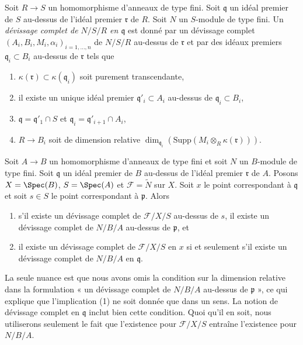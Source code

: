 \begin{definition}
\label{definition-complete-devissage-at-x-algebra}
Soit $R \to S$ un homomorphisme d'anneaux de type fini.
Soit $\mathfrak q$ un idéal premier de $S$ au-dessus de l'idéal premier $\mathfrak r$ de $R$.
Soit $N$ un $S$-module de type fini.
Un {\it d\'evissage complet de $N/S/R$ en $\mathfrak q$} est donné par un
d\'evissage complet $(A_i, B_i, M_i, \alpha_i)_{i = 1, \ldots, n}$
de $N/S/R$ au-dessus de $\mathfrak r$ et par des idéaux premiers $\mathfrak q_i \subset B_i$
au-dessus de $\mathfrak r$ tels que
\begin{enumerate}
\item $\kappa(\mathfrak r) \subset \kappa(\mathfrak q_i)$ soit purement
transcendante,
\item il existe un unique idéal premier $\mathfrak q'_i \subset A_i$
au-dessus de $\mathfrak q_i \subset B_i$,
\item $\mathfrak q = \mathfrak q'_1 \cap S$ et
$\mathfrak q_i = \mathfrak q'_{i + 1} \cap A_i$,
\item $R \to B_i$ soit de dimension relative
$\dim_{\mathfrak q_i}(\text{Supp}(M_i \otimes_R \kappa(\mathfrak r)))$.
\end{enumerate}
\end{definition}

\begin{remark}
\label{remark-same-notion}
Soit $A \to B$ un homomorphisme d'anneaux de type fini et soit $N$ un
$B$-module de type fini. Soit $\mathfrak q$ un idéal premier de $B$ au-dessus de l'idéal premier
$\mathfrak r$ de $A$. Posons $X = \Spec(B)$, $S = \Spec(A)$ et
$\mathcal{F} = \widetilde{N}$ sur $X$. Soit $x$ le point correspondant
à $\mathfrak q$ et soit $s \in S$ le point correspondant à
$\mathfrak p$. Alors
\begin{enumerate}
\item s'il existe un d\'evissage complet de $\mathcal{F}/X/S$
au-dessus de $s$, il existe un d\'evissage complet de
$N/B/A$ au-dessus de $\mathfrak p$, et
\item il existe un d\'evissage complet de $\mathcal{F}/X/S$
en $x$ si et seulement s'il existe un d\'evissage complet de
$N/B/A$ en $\mathfrak q$.
\end{enumerate}
La seule nuance est que nous avons omis la condition sur
la dimension relative dans la formulation « un d\'evissage complet de
$N/B/A$ au-dessus de $\mathfrak p$ », ce qui explique que l'implication (1)
ne soit donnée que dans un sens.
La notion de d\'evissage complet en
$\mathfrak q$ inclut bien cette condition. Quoi qu'il en soit, nous utiliserons
seulement le fait que l'existence pour $\mathcal{F}/X/S$
entraîne l'existence pour $N/B/A$.
\end{remark}

